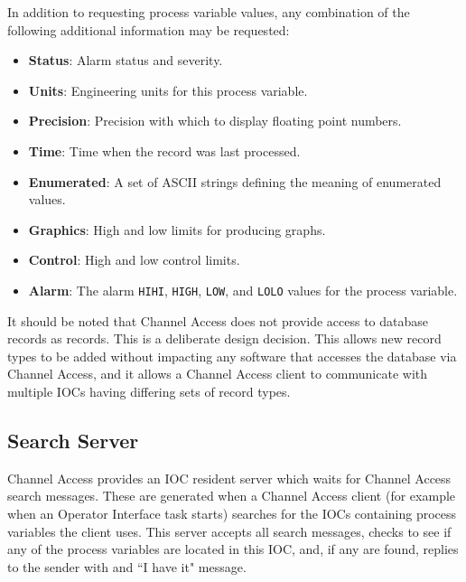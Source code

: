 In addition to requesting process variable values, any combination of the following additional information may be 
requested:

\begin{itemize}
\item \textbf{Status}:  Alarm status and severity.

\item \textbf{Units}:  Engineering units for this process variable.

\item \textbf{Precision}:  Precision with which to display floating point numbers.

\item \textbf{Time}:  Time when the record was last processed.

\item \textbf{Enumerated}:  A set of ASCII strings defining the meaning of enumerated values.

\item \textbf{Graphics}:  High and low limits for producing graphs.

\item \textbf{Control}:  High and low control limits.

\item \textbf{Alarm}:  The alarm \verb|HIHI|, \verb|HIGH|, \verb|LOW|, and \verb|LOLO| values for the process variable.
\end{itemize}

It should be noted that Channel Access does not provide access to database records as records. This is a deliberate design 
decision. This allows new record types to be added without impacting any software that accesses the database via Channel 
Access, and it allows a Channel Access client to communicate with multiple IOCs having differing sets of record types.

\subsection{Search Server}

Channel Access provides an IOC resident server which waits for Channel Access search messages. These are generated 
when a Channel Access client (for example when an Operator Interface task starts) searches for the IOCs containing 
process variables the client uses. This server accepts all search messages, checks to see if any of the process variables are 
located in this IOC, and, if any are found, replies to the sender with and ``I have it" message.

